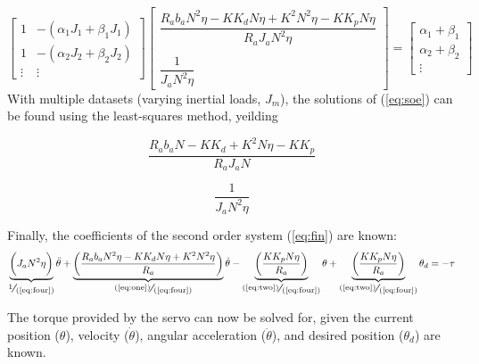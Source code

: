 \documentclass[12pt]{report}
\begin{document}
\begin{equation}
\begin{bmatrix}
  1 & -(\alpha_1J_1+\beta_1J_1) \\
  1 & -(\alpha_2J_2+\beta_2J_2) \\
  \vdots & \vdots
\end{bmatrix}
\begin{bmatrix}
  \dfrac{R_ab_aN^2\eta-KK_dN\eta+K^2N^2\eta-KK_pN\eta}{R_aJ_aN^2\eta} \\
  ~\\
  \dfrac{1}{J_aN^2\eta}
\end{bmatrix}
=
\begin{bmatrix}
  \alpha_1+\beta_1 \\
  \alpha_2+\beta_2 \\
  \vdots
\end{bmatrix}
\label{eq:soe}
\end{equation}
With multiple datasets (varying inertial loads, $J_m$), the solutions of (\ref{eq:soe}) can be found using the least-squares method, yeilding

\begin{minipage}[c]{.5\textwidth}
\begin{equation}
  \frac{R_ab_aN-KK_d+K^2N\eta-KK_p}{R_aJ_aN}
  \label{eq:three}
\end{equation}
\end{minipage}%
\begin{minipage}[c]{.5\textwidth}
\begin{equation}
  \frac{1}{J_aN^2\eta}
  \label{eq:four}
\end{equation}
\end{minipage}

Finally, the coefficients of the second order system (\ref{eq:fin}) are known:
\begin{equation}
  \underbrace{\bigg(J_aN^2\eta\bigg)}_{\scalebox{1.25}{\sfrac{1}{(\ref{eq:four})}}}\ddot{\theta} + \underbrace{\left(\frac{R_ab_aN^2\eta - KK_dN\eta + K^2N^2\eta}{R_a}\right)}_{\quad\scalebox{1.25}{\sfrac{(\ref{eq:one})}{(\ref{eq:four})}}}
  \dot{\theta} - \underbrace{\left(\frac{KK_pN\eta}{R_a}\right)}_{\scalebox{1.25}{\sfrac{(\ref{eq:two})}{(\ref{eq:four})}}}
  \theta + \underbrace{\left(\frac{KK_pN\eta}{R_a}\right)}_{\scalebox{1.25}{\sfrac{(\ref{eq:two})}{(\ref{eq:four})}}}
  \theta_d = -\tau
  \label{eq:fin}
\end{equation}

\newpage
The torque provided by the servo can now be solved for, given the current position ($\theta$), velocity ($\dot{\theta}$), angular acceleration ($\ddot{\theta}$), and desired position ($\theta_d$) are known.
\end{document}
